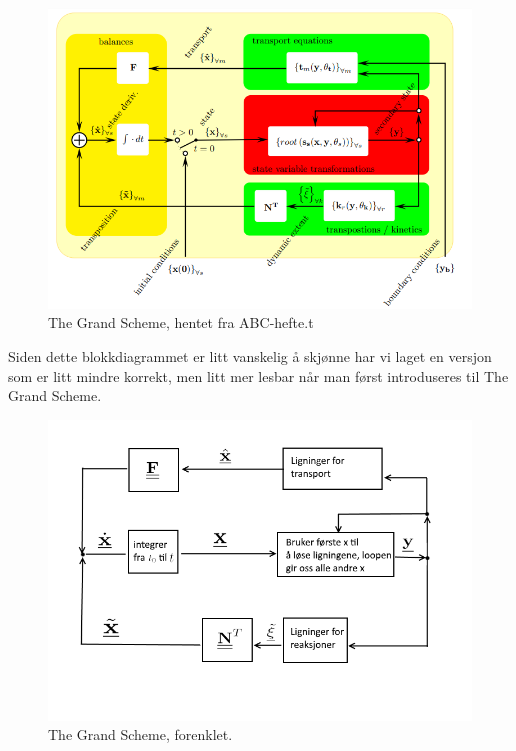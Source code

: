 \begin{figure}[H]
    \centering
    \includegraphics[scale=0.7]{Figures/The_grand_scheme_hard}
    \caption{The Grand Scheme, hentet fra ABC-hefte.t}
    \label{fig:grand_scheme_hard}
\end{figure}

Siden dette blokkdiagrammet er litt vanskelig å skjønne har vi laget en versjon som er litt mindre korrekt, men litt mer lesbar når man først introduseres til The Grand Scheme.

\begin{figure}[H]
    \centering
    \includegraphics[scale=0.7]{Figures/The_grand_scheme_enkel.png}
    \caption{The Grand Scheme, forenklet.}
    \label{fig:grand_scheme_enkel}
\end{figure}

